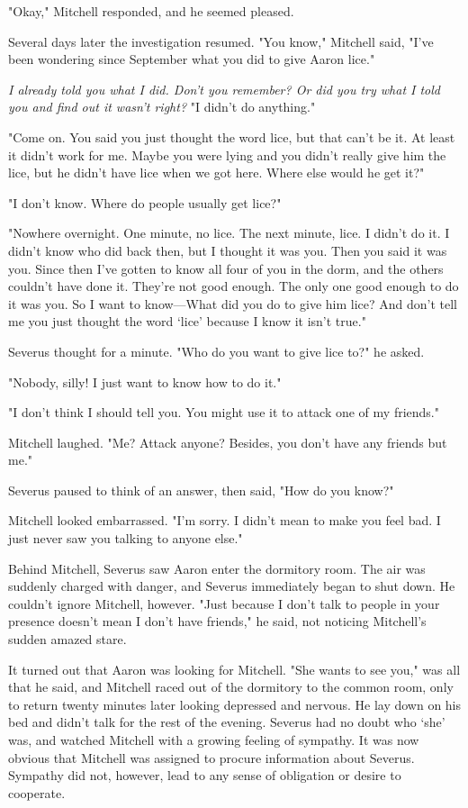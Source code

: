 "Okay," Mitchell responded, and he seemed pleased.

Several days later the investigation resumed. "You know," Mitchell said, "I've been wondering since September what you did to give Aaron lice."

\emph{I already told you what I did. Don't you remember? Or did you try what I told you and find out it wasn't right?} "I didn't do{\el} anything."

"Come on. You said you just thought the word lice, but that can't be it. At least it didn't work for me. Maybe you were lying and you didn't really give him the lice, but he didn't have lice when we got here. Where else would he get it?"

"I don't{\el} know. Where do people{\el} usually get lice?"

"Nowhere overnight. One minute, no lice. The next minute, lice. I didn't do it. I didn't know who did back then, but I thought it was you. Then you said it was you. Since then I've gotten to know all four of you in the dorm, and the others couldn't have done it. They're not good enough. The only one good enough to do it was you. So I want to know—What did you do to give him lice? And don't tell me you just thought the word `lice' because I know it isn't true."

Severus thought for a minute. "Who do{\el} you want to give{\el} lice to?" he asked.

"Nobody, silly! I just want to know how to do it."

"I don't think{\el} I should tell you. You{\el} might use it to attack{\el} one of my friends."

Mitchell laughed. "Me? Attack anyone? Besides, you don't have any friends but me."

Severus paused to think of an answer, then said, "How do{\el} you know?"

Mitchell looked embarrassed. "I'm sorry. I didn't mean to make you feel bad. I just never saw you talking to anyone else."

Behind Mitchell, Severus saw Aaron enter the dormitory room. The air was suddenly charged with danger, and Severus immediately began to shut down. He couldn't ignore Mitchell, however. "Just because I don't talk to people in your presence doesn't mean I don't have friends," he said, not noticing Mitchell's sudden amazed stare.

It turned out that Aaron was looking for Mitchell. "She wants to see you," was all that he said, and Mitchell raced out of the dormitory to the common room, only to return twenty minutes later looking depressed and nervous. He lay down on his bed and didn't talk for the rest of the evening. Severus had no doubt who `she' was, and watched Mitchell with a growing feeling of sympathy. It was now obvious that Mitchell was assigned to procure information about Severus. Sympathy did not, however, lead to any sense of obligation or desire to cooperate.


